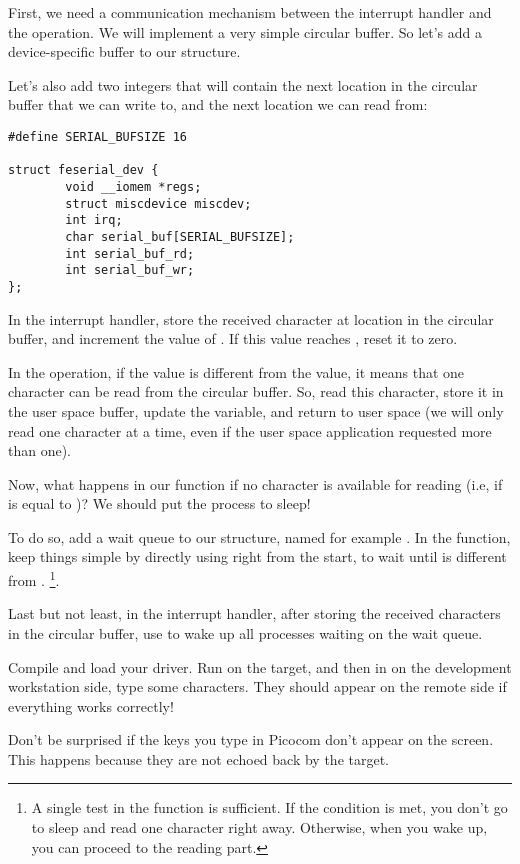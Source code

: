 First, we need a communication mechanism between the interrupt handler
and the  operation. We will implement a very simple
circular buffer. So let's add a device-specific buffer to our 
 structure.

Let's also add two integers that will contain the next location
in the circular buffer that we can write to, and the next location
we can read from:

\begin{verbatim}
#define SERIAL_BUFSIZE 16

struct feserial_dev {
        void __iomem *regs;
        struct miscdevice miscdev;
        int irq;
        char serial_buf[SERIAL_BUFSIZE];
        int serial_buf_rd;
        int serial_buf_wr;
};
\end{verbatim}

In the interrupt handler, store the received character at location
 in the circular buffer, and increment the value
of . If this value reaches ,
reset it to zero.

In the  operation, if the  value is
different from the  value, it means that one
character can be read from the circular buffer. So, read this
character, store it in the user space buffer, update the
 variable, and return to user space (we will only
read one character at a time, even if the user space application
requested more than one).

Now, what happens in our  function if no character is
available for reading (i.e, if  is equal to
)? We should put the process to sleep!

To do so, add a wait queue to our  structure,
named for example . In the  function,
keep things simple by directly using 
right from the start, to wait until 
is different from . \footnote{A single test in the 
 function is sufficient. If the
condition is met, you don't go to sleep and read one character right away.
Otherwise, when you wake up, you can proceed to the reading part.}.

Last but not least, in the interrupt handler,
after storing the received characters in the circular buffer, use
 to wake up all processes waiting on the wait queue.

Compile and load your driver. Run 
on the target, and then in  on the development
workstation side, type some characters. They should appear on the
remote side if everything works correctly!

Don't be surprised if the keys you type in Picocom don't appear on the
screen. This happens because they are not echoed back by the target.
